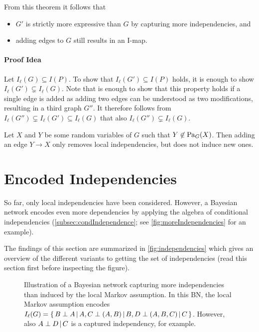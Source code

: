 			From this theorem it follows that
			\begin{itemize}
				\item \(G'\) is strictly more expressive than \(G\) by capturing more independencies, and
				\item adding edges to \(G\) still results in an I-map.
			\end{itemize}

			\paragraph{Proof Idea} %
				Let \( I_\ell(G) \subseteq I(P) \). To show that \( I_\ell(G') \subseteq I(P) \) holds, it is enough to show \( I_\ell(G') \subsetneq I_\ell(G) \). Note that is enough to show that this property holds if a single edge is added as adding two edges can be understood as two modifications, resulting in a third graph \(G''\). It therefore follows from \( I_\ell(G'') \subsetneq I_\ell(G') \subseteq I_\ell(G) \) that also \( I_\ell(G'') \subsetneq I_\ell(G) \).

				Let \(X\) and \(Y\) be some random variables of \(G\) such that \( Y \not\in \operatorname{Pa}_G(X) \). Then adding an edge \( Y \to X \) only removes local independencies, but does not induce new ones.


	\section{Encoded Independencies} %
		So far, only local independencies have been considered. However, a Bayesian network encodes even more dependencies by applying the algebra of conditional independencies (\autoref{subsec:condIndependence}; see \autoref{fig:moreIndependencies} for an example).

		The findings of this section are summarized in \autoref{fig:independencies} which gives an overview of the different variants to getting the set of independencies (read this section first before inspecting the figure).

		\begin{figure}
			\centering
			\caption[A Bayesian Network Captures More than Local Independencies]{Illustration of a Bayesian network capturing more independencies than induced by the local Markov assumption. In this BN, the local Markov assumption encodes \( I_\ell(G) = \{\, B \perp A \,\vert\, A, C \perp (A, B) \,\vert\, B, D \perp (A, B, C) \,\vert\, C \,\} \). However, also \( A \perp D \,\vert\, C \) is a captured independency, for example.}
			\label{fig:moreIndependencies}
		\end{figure}

